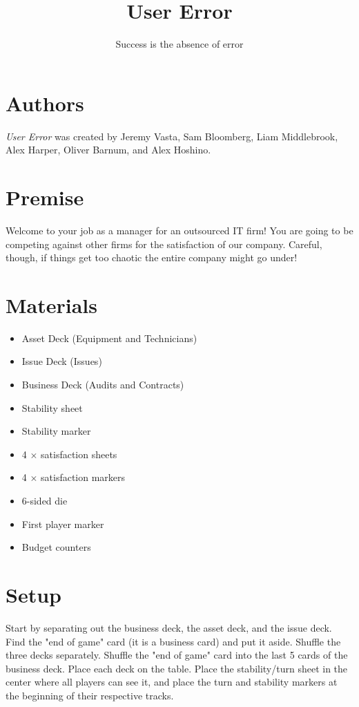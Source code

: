 \documentclass[twocolumn]{article}
\title{User Error}
\author{Success is the absence of error}
\date{}
\begin{document}
\maketitle

\section*{Authors}

\emph{User Error} was created by Jeremy Vasta, Sam Bloomberg, Liam Middlebrook, Alex Harper, Oliver Barnum, and Alex Hoshino.

\section*{Premise}

Welcome to your job as a manager for an outsourced IT firm! You are going to be competing against other firms for the satisfaction of our company. Careful, though, if things get too chaotic the entire company might go under!

\section*{Materials}

\begin{itemize}
	\item Asset Deck (Equipment and Technicians)
	\item Issue Deck (Issues)
	\item Business Deck (Audits and Contracts)
	\item Stability sheet
	\item Stability marker
	\item 4 $\times$ satisfaction sheets
	\item 4 $\times$ satisfaction markers
	\item 6-sided die
	\item First player marker
	\item Budget counters
\end{itemize}

\section*{Setup}

Start by separating out the business deck, the asset deck, and the issue deck. Find the "end of game" card (it is a business card) and put it aside. Shuffle the three decks separately. Shuffle the "end of game" card into the last 5 cards of the business deck. Place each deck on the table. Place the stability/turn sheet in the center where all players can see it, and place the turn and stability markers at the beginning of their respective tracks.
\end{document}
